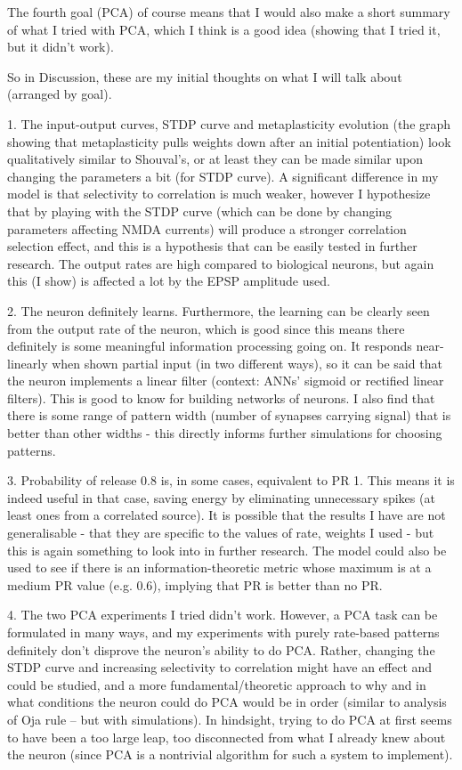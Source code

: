 \documentclass[a4paper,12pt]{report}
\theoremstyle{definition}
\begin{document}
The fourth goal (PCA) of course means that I would also make a short summary of what I tried with PCA, which I think is a good idea (showing that I tried it, but it didn't work).

So in Discussion, these are my initial thoughts on what I will talk about (arranged by goal).

1. The input-output curves, STDP curve and metaplasticity evolution (the graph showing that metaplasticity pulls weights down after an initial potentiation) look qualitatively similar to Shouval's, or at least they can be made similar upon changing the parameters a bit (for STDP curve). A significant difference in my model is that selectivity to correlation is much weaker, however I hypothesize that by playing with the STDP curve (which can be done by changing parameters affecting NMDA currents) will produce a stronger correlation selection effect, and this is a hypothesis that can be easily tested in further research. The output rates are high compared to biological neurons, but again this (I show) is affected a lot by the EPSP amplitude used.

2. The neuron definitely learns. Furthermore, the learning can be clearly seen from the output rate of the neuron, which is good since this means there definitely is some meaningful information processing going on. It responds near-linearly when shown partial input (in two different ways), so it can be said that the neuron implements a linear filter (context: ANNs' sigmoid or rectified linear filters). This is good to know for building networks of neurons.
I also find that there is some range of pattern width (number of synapses carrying signal) that is better than other widths - this directly informs further simulations for choosing patterns.

3. Probability of release 0.8 is, in some cases, equivalent to PR 1. This means it is indeed useful in that case, saving energy by eliminating unnecessary spikes (at least ones from a correlated source). It is possible that the results I have are not generalisable - that they are specific to the values of  {rate, weights} I used - but this is again something to look into in further research. The model could also be used to see if there is an information-theoretic metric whose maximum is at a medium PR value (e.g. 0.6), implying that PR is better than no PR.

4. The two PCA experiments I tried didn't work. However, a PCA task can be formulated in many ways, and my experiments with purely rate-based patterns definitely don't disprove the neuron's ability to do PCA. Rather, changing the STDP curve and increasing selectivity to correlation might have an effect and could be studied, and a more fundamental/theoretic approach to why and in what conditions the neuron could do PCA would be in order (similar to analysis of Oja rule -- but with simulations). In hindsight, trying to do PCA at first seems to have been a too large leap, too disconnected from what I already knew about the neuron (since PCA is a nontrivial algorithm for such a system to implement).
\end{document}
